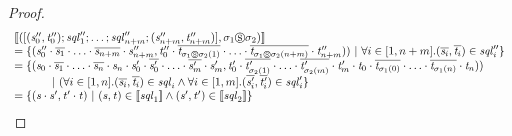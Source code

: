 \documentclass[numbers,10pt,preprint\ifanon ,nocopyrightspace\fi]{sigplanconf}
\begin{document}
\begin{proof}
  \[
    \begin{array}{l}
      [ \! [([(\mathit{s}_0'',\mathit{t}_0'');\mathit{sql}_1'';
      \ldots;
      \mathit{sql}_{n+m}'';(\mathit{s}_{n+m}'',\mathit{t}_{n+m}'')],
      \sigma_1\circledS\sigma_2)] \! ]\\
      = \{(\mathit{s}_0''\cdot\overline{\mathit{s}_1}\cdot
      \ldots\cdot\overline{\mathit{s}_{n+m}}\cdot\mathit{s}_{n+m}'',
      \mathit{t}_0''\cdot\overline{\mathit{t}_{\sigma_1\circledS\sigma_2(1)}}\cdot
      \ldots\cdot\overline{\mathit{t}_{\sigma_1\circledS\sigma_2(n+m)}}\cdot\mathit{t}_{n+m}''))~|~
      \forall i\in[1,n+m].(\overline{\mathit{s}_i},\overline{\mathit{t}_i})\in\mathit{sql}_i''\}\\
      = \{(\mathit{s}_0\cdot\overline{\mathit{s}_1}\cdot\ldots\cdot
      \overline{\mathit{s}_n}\cdot\mathit{s}_n\cdot\mathit{s}_0'\cdot\overline{\mathit{s}_{0}'}\cdot
      \ldots\cdot\overline{\mathit{s}_m'}\cdot\mathit{s}_m',
      \mathit{t}_0'\cdot\overline{\mathit{t}_{\sigma_2(1)}'}\cdot\ldots\cdot
      \overline{\mathit{t}_{\sigma_2(m)}'}\cdot\mathit{t}_m'\cdot\mathit{t}_0
      \cdot\overline{\mathit{t}_{\sigma_1(0)}}\cdot
      \ldots\cdot\overline{\mathit{t}_{\sigma_1(n)}}\cdot\mathit{t}_n))\\
      \hspace*{3em}~|~
      (\forall i\in[1,n].
      (\overline{\mathit{s}_i},\overline{\mathit{t}_i})\in\mathit{sql}_i
      \wedge
      \forall i\in[1,m].
      (\overline{\mathit{s}_i'},\overline{\mathit{t}_i'})\in\mathit{sql}_i'\}\\
      = \{(\mathit{s}\cdot\mathit{s}',\mathit{t}'\cdot\mathit{t})~|~
      (\mathit{s},\mathit{t})\in[ \! [\mathit{sql}_1] \! ]
      \wedge
      (\mathit{s}',\mathit{t}')\in[ \! [\mathit{sql}_2] \! ]\}
    \end{array}
  \]
\end{proof}
\end{document}
